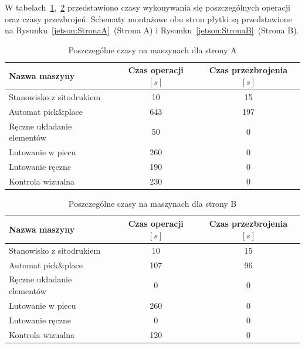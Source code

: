 \breakparagraph{}
W tabelach~\ref{jetson:A},\ \ref{jetson:B} przedstawiono czasy wykonywania się poszczególnych operacji oraz czasy przezbrojeń. Schematy montażowe obu stron płytki są przedstawione na Rysunku~\ref{jetson:StronaA}~(Strona A) i Rysunku~\ref{jetson:StronaB}~(Strona B).

\begin{table}[H]
	\centering
	\caption{Poszczególne czasy na maszynach dla strony A}
	\begin{tabular}{lcc}
		\toprule
		Nazwa maszyny                 & Czas operacji $[s]$ & Czas przezbrojenia $[s]$ \\
		\midrule
		Stanowisko z sitodrukiem      & 10                  & 15                       \\
		Automat pick\&place           & 643                 & 197                      \\
		Ręczne układanie elementów & 50                  & 0                        \\
		Lutowanie w piecu             & 260                 & 0                        \\
		Lutowanie ręczne             & 190                 & 0                        \\
		Kontrola wizualna             & 230                 & 0                        \\
		\bottomrule
	\end{tabular}
	\label{jetson:A}
\end{table}

\begin{table}[H]
	\centering
	\caption{Poszczególne czasy na maszynach dla strony B}
	\begin{tabular}{lcc}
		\toprule
		Nazwa maszyny                 & Czas operacji $[s]$ & Czas przezbrojenia $[s]$ \\
		\midrule
		Stanowisko z sitodrukiem      & 10                  & 15                       \\
		Automat pick\&place           & 107                 & 96                       \\
		Ręczne układanie elementów & 0                   & 0                        \\
		Lutowanie w piecu             & 260                 & 0                        \\
		Lutowanie ręczne             & 0                   & 0                        \\
		Kontrola wizualna             & 120                 & 0                        \\
		\bottomrule
	\end{tabular}
	\label{jetson:B}
\end{table}

